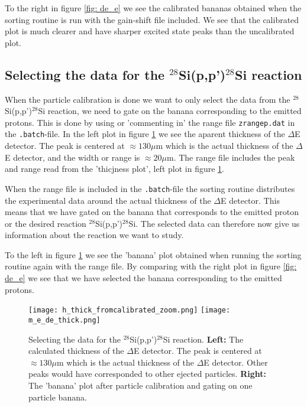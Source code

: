 \documentclass[11pt,a4wide]{article}
\begin{document}
To the right in figure \ref{fig: de_e} we see the calibrated bananas obtained when the sorting routine is run with the gain-shift file included. We see that the calibrated plot is much clearer and have sharper excited state peaks than the uncalibrated plot. 

\subsection{Selecting the data for the ${}^{28}$Si(p,p')$^{28}$Si reaction}
When the particle calibration is done we want to only select the data from the ${}^{28}$Si(p,p')$^{28}$Si reaction, we need to gate on the banana corresponding to the emitted protons. This is done by using or 'commenting in' the range file \texttt{zrangep.dat} in the \texttt{.batch}-file. In the left plot in figure \ref{fig: banana_gate} we see the aparent thickness of the $\Delta$E detector. The peak is centered at $\approx 130 \mu$m which is the actual thickness of the $\Delta$E detector, and the width or range is $\approx 20\mu$m. The range file includes the peak and range read from the 'thicjness plot', left plot in figure \ref{fig: banana_gate}. 

When the range file is included in the \texttt{.batch}-file the sorting routine distributes the experimental data around the actual thickness of the $\Delta$E detector. This means that we have gated on the banana that corresponds to the emitted proton or the desired reaction ${}^{28}$Si(p,p')$^{28}$Si. The selected data can therefore now give us information about the reaction we want to study. 

To the left in figure \ref{fig: banana_gate} we see the 'banana' plot obtained when running the sorting routine again with the range file. By comparing with the right plot in figure \ref{fig: de_e} we see that we have selected the banana corresponding to the emitted protons. 

\begin{figure}[htp]
\centering 
\texttt{[image: h\_thick\_fromcalibrated\_zoom.png]}
\texttt{[image: m\_e\_de\_thick.png]}
\caption{Selecting the data for the ${}^{28}$Si(p,p')$^{28}$Si reaction. \textbf{Left:} The calculated thickness of the $\Delta$E detector. The peak is centered at $\approx 130 \mu$m which is the actual thickness of the $\Delta$E detector. Other peaks would have corresponded to other ejected particles. \textbf{Right:} The 'banana' plot after particle calibration and gating on one particle banana.}
\label{fig: banana_gate}
\end{figure}
\end{document}
